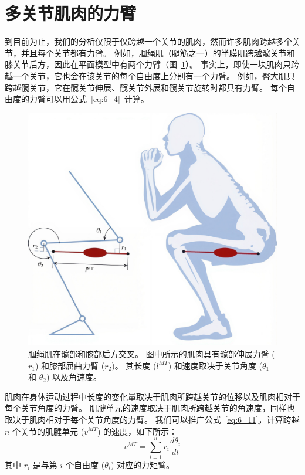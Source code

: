 \section{多关节肌肉的力臂}

到目前为止，我们的分析仅限于仅跨越一个关节的肌肉，然而许多肌肉跨越多个关节，并且每个关节都有力臂。
例如，腘绳肌（腿筋之一）的半膜肌跨越髋关节和膝关节后方，因此在平面模型中有两个力臂（图~\ref{fig:6_9}）。
事实上，即使一块肌肉只跨越一个关节，它也会在该关节的每个自由度上分别有一个力臂。
例如，臀大肌只跨越髋关节，它在髋关节伸展、髋关节外展和髋关节旋转时都具有力臂。
每个自由度的力臂可以用公式~\ref{eq:6_4}~计算。


\begin{figure}[!htb]
	\centering
	\includegraphics[width=0.8\linewidth]{chap6/6_9}
	\caption{腘绳肌在髋部和膝部后方交叉。
		图中所示的肌肉具有髋部伸展力臂 ($r_1$) 和膝部屈曲力臂 ($r_2$)。
		其长度 ($l^{MT}$) 和速度取决于关节角度 ($\theta_1$ 和 $\theta_2$) 以及角速度。 \label{fig:6_9}}
\end{figure}


肌肉在身体运动过程中长度的变化量取决于肌肉所跨越关节的位移以及肌肉相对于每个关节角度的力臂。
肌腱单元的速度取决于肌肉所跨越关节的角速度，同样也取决于肌肉相对于每个关节角度的力臂。
我们可以推广公式~\ref{eq:6_11}，计算跨越 $n$ 个关节的肌腱单元 ($v^{MT}$) 的速度，如下所示：
%
\begin{equation}
	v^{MT} = 
		\sum_{i=1}^{n}
			r_i
			\frac{d \theta_i}{d t}
	\label{eq:6_12}
\end{equation}
%
其中 $r_i$ 是与第 $i$ 个自由度 ($\theta_i$) 对应的力矩臂。


